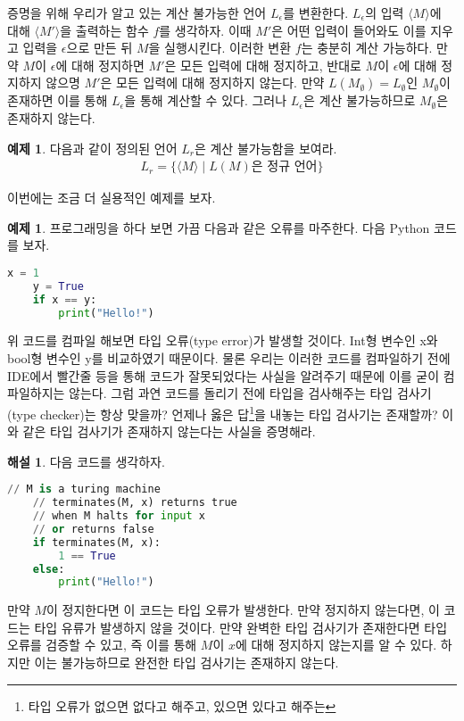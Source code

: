\documentclass[b5paper, 11pt]{book}
\theoremstyle{definition}
\newtheorem{ex}[defn]{예제}
\newtheorem*{ans*}{해설}
\newenvironment{pf*}{\pushQED{\qed}\pf}
{\popQED\endpf}
\begin{document}
\begin{pf*}
    증명을 위해 우리가 알고 있는 계산 불가능한 언어 $L_\epsilon$를 변환한다. 
    $L_\epsilon$의 입력 $\langle M \rangle$에 대해 $\langle M' \rangle$을 
    출력하는 함수 $f$를 생각하자. 이때 $M'$은 어떤 입력이 들어와도 이를 지우고
    입력을 $\epsilon$으로 만든 뒤 $M$을 실행시킨다. 이러한 변환 $f$는 충분히
    계산 가능하다. 만약 $M$이 $\epsilon$에 대해 정지하면 $M'$은 모든 입력에 대해
    정지하고, 반대로 $M$이 $\epsilon$에 대해 정지하지 않으명 $M'$은 모든 입력에
    대해 정지하지 않는다. 만약 $L(M_\emptyset) = L_\emptyset$인 $M_\emptyset$이
    존재하면 이를 통해 $L_\epsilon$을 통해 계산할 수 있다. 그러나 $L_\epsilon$은
    계산 불가능하므로 $M_\emptyset$은 존재하지 않는다.
\end{pf*}
\begin{ex}
    다음과 같이 정의된 언어 $L_r$은 계산 불가능함을 보여라.
    \begin{align*}
        L_r = \{ \langle M \rangle \;\vert\; L(M) \text{은 정규 언어} \}
    \end{align*}
\end{ex}
이번에는 조금 더 실용적인 예제를 보자. 
\begin{ex}
    프로그래밍을 하다 보면 가끔 다음과 같은 오류를 마주한다. 다음 Python 코드를 보자.
\begin{lstlisting}[language=Python]
    x = 1 
    y = True
    if x == y:
        print("Hello!")
\end{lstlisting}
    위 코드를 컴파일 해보면 타입 오류(type error)가 발생할 것이다. Int형 변수인 x와 bool형 변수인 y를 비교하였기 때문이다. 물론 우리는 이러한 코드를 컴파일하기 전에 IDE에서 빨간줄 등을 통해 코드가 잘못되었다는 사실을 알려주기 때문에 이를 굳이 컴파일하지는 않는다. 그럼 과연 코드를 돌리기 전에 타입을 검사해주는 타입 검사기(type checker)는 항상 맞을까? 언제나 옳은 답\footnote{타입 오류가 없으면 없다고 해주고, 있으면 있다고 해주는}을 내놓는 타입 검사기는 존재할까? 이와 같은 타입 검사기가 존재하지 않는다는 사실을 증명해라. 
\end{ex}
\begin{ans*}
    다음 코드를 생각하자. 
\begin{lstlisting}[language=Python]
    // M is a turing machine
    // terminates(M, x) returns true 
    // when M halts for input x
    // or returns false 
    if terminates(M, x):
        1 == True 
    else:
        print("Hello!")
\end{lstlisting}
만약 $M$이 정지한다면 이 코드는 타입 오류가 발생한다. 만약 정지하지 않는다면, 이 코드는 타입 유류가 발생하지 않을 것이다. 만약 완벽한 타입 검사기가 존재한다면 타입 오류를 검증할 수 있고, 즉 이를 통해 $M$이 $x$에 대해 정지하지 않는지를 알 수 있다. 하지만 이는 불가능하므로 완전한 타입 검사기는 존재하지 않는다. 
\end{ans*}
\end{document}
